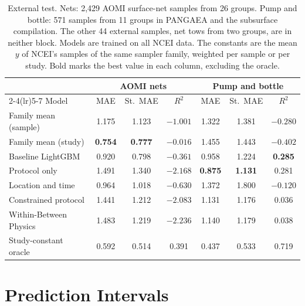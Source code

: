 \documentclass[12pt,a4paper]{report}
\newcommand{\Rsq}{$R^2$}
\begin{document}
\begin{table}[!htbp]
\centering
\caption[External test on AOMI nets and on pump and bottle samples]{External test. Nets: 2,429 AOMI surface-net samples from 26 groups. Pump and bottle: 571 samples from 11 groups in PANGAEA and the subsurface compilation. The other 44 external samples, net tows from two groups, are in neither block. Models are trained on all NCEI data. The constants are the mean $y$ of NCEI's samples of the same sampler family, weighted per sample or per study. Bold marks the best value in each column, excluding the oracle.}
\label{tab:external}
\setlength{\tabcolsep}{1.6pt}
\begin{tabular}{@{}lcccccc@{}}
\toprule
 & \multicolumn{3}{c}{AOMI nets} & \multicolumn{3}{c}{Pump and bottle}\\
\cmidrule(lr){2-4}\cmidrule(lr){5-7}
Model & MAE & St.\ MAE & \Rsq & MAE & St.\ MAE & \Rsq\\
\midrule
Family mean (sample) & 1.175 & 1.123 & $-1.001$ & 1.322 & 1.381 & $-0.280$\\
Family mean (study) & \textbf{0.754} & \textbf{0.777} & $\mathbf{-0.016}$ & 1.455 & 1.443 & $-0.402$\\
Baseline LightGBM & 0.920 & 0.798 & $-0.361$ & 0.958 & 1.224 & \textbf{0.285}\\
Protocol only & 1.491 & 1.340 & $-2.168$ & \textbf{0.875} & \textbf{1.131} & 0.281\\
Location and time & 0.964 & 1.018 & $-0.630$ & 1.372 & 1.800 & $-0.120$\\
Constrained protocol & 1.441 & 1.212 & $-2.083$ & 1.131 & 1.176 & 0.036\\
Within-Between Physics & 1.483 & 1.219 & $-2.236$ & 1.140 & 1.179 & 0.038\\
\midrule
Study-constant oracle & 0.592 & 0.514 & 0.391 & 0.437 & 0.533 & 0.719\\
\bottomrule
\end{tabular}
\end{table}

\section{Prediction Intervals}
\end{document}
